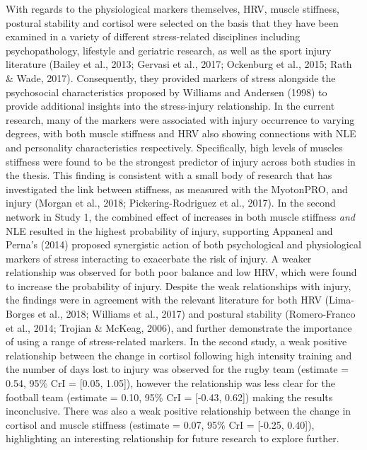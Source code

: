 \documentclass[
  english,
  man,floatsintext]{apa6}
\begin{document}
With regards to the physiological markers themselves, HRV, muscle stiffness, postural stability and cortisol were selected on the basis that they have been examined in a variety of different stress-related disciplines including psychopathology, lifestyle and geriatric research, as well as the sport injury literature (Bailey et al., 2013; Gervasi et al., 2017; Ockenburg et al., 2015; Rath \& Wade, 2017).
Consequently, they provided markers of stress alongside the psychosocial characteristics proposed by Williams and Andersen (1998) to provide additional insights into the stress-injury relationship.
In the current research, many of the markers were associated with injury occurrence to varying degrees, with both muscle stiffness and HRV also showing connections with NLE and personality characteristics respectively.
Specifically, high levels of muscles stiffness were found to be the strongest predictor of injury across both studies in the thesis.
This finding is consistent with a small body of research that has investigated the link between stiffness, as measured with the MyotonPRO, and injury (Morgan et al., 2018; Pickering-Rodriguez et al., 2017).
In the second network in Study 1, the combined effect of increases in both muscle stiffness \emph{and} NLE resulted in the highest probability of injury, supporting Appaneal and Perna's (2014) proposed synergistic action of both psychological and physiological markers of stress interacting to exacerbate the risk of injury.
A weaker relationship was observed for both poor balance and low HRV, which were found to increase the probability of injury.
Despite the weak relationships with injury, the findings were in agreement with the relevant literature for both HRV (Lima-Borges et al., 2018; Williams et al., 2017) and postural stability (Romero-Franco et al., 2014; Trojian \& McKeag, 2006), and further demonstrate the importance of using a range of stress-related markers.
In the second study, a weak positive relationship between the change in cortisol following high intensity training and the number of days lost to injury was observed for the rugby team (estimate = 0.54, 95\% CrI = {[}0.05, 1.05{]}), however the relationship was less clear for the football team (estimate = 0.10, 95\% CrI = {[}-0.43, 0.62{]}) making the results inconclusive.
There was also a weak positive relationship between the change in cortisol and muscle stiffness (estimate = 0.07, 95\% CrI = {[}-0.25, 0.40{]}), highlighting an interesting relationship for future research to explore further.
\end{document}
